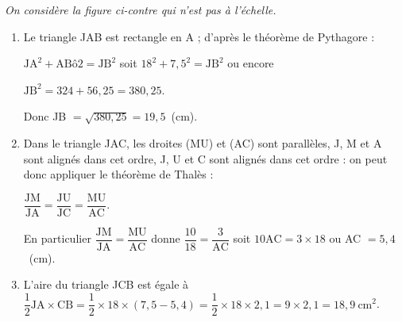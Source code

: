 
\medskip

\emph{On considère la figure ci-contre qui n'est pas à l'échelle.}

\medskip


\begin{enumerate}
\item %
Le triangle JAB est rectangle en A ; d'après le théorème de Pythagore :

$\text{JA}^2 + \text{AB}ô2 = \text{JB}^2$ soit $18^2 + 7,5^2 =  \text{JB}^2$ ou encore 

$\text{JB}^2 = 324 + 56,25 = 380,25$.

Donc JB $ = \sqrt{380,25} = 19,5$~(cm).
\item %
Dans le triangle JAC, les droites (MU) et (AC) sont parallèles, J, M et A sont alignés dans cet ordre, J, U et C  sont alignés dans cet ordre : on peut donc appliquer le théorème de Thalès :

$\dfrac{\text{JM}}{\text{JA}} = \dfrac{\text{JU}}{\text{JC}} = \dfrac{\text{MU}}{\text{AC}}$.

En particulier $\dfrac{\text{JM}}{\text{JA}} =  \dfrac{\text{MU}}{\text{AC}}$ donne $\dfrac{10}{18} = \dfrac{3}{\text{AC}}$ soit $10\text{AC} = 3 \times 18$ ou AC $ = 5,4$~(cm).
\item %
L'aire  du triangle JCB est égale à $\dfrac{1}{2} \text{JA} \times \text{CB} = \dfrac{1}{2} \times 18 \times (7,5 - 5,4)  = \dfrac{1}{2} \times 18 \times 2,1  = 9 \times 2,1 = 18,9~\text{cm}^2$.
\end{enumerate}

\vspace{0.5cm}

